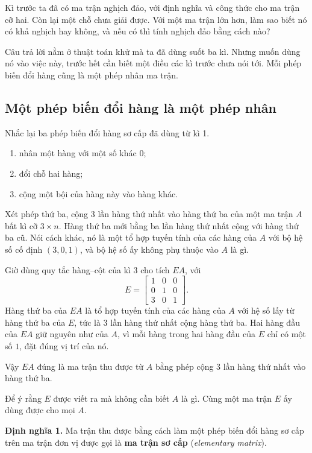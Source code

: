 \documentclass[12pt,a4paper]{article}
\begin{document}
Kì trước ta đã có ma trận nghịch đảo, với định nghĩa và công thức cho ma trận cỡ hai. Còn lại một chỗ chưa giải được. Với một ma trận lớn hơn, làm sao biết nó có khả nghịch hay không, và nếu có thì tính nghịch đảo bằng cách nào?

Câu trả lời nằm ở thuật toán khử mà ta đã dùng suốt ba kì. Nhưng muốn dùng nó vào việc này, trước hết cần biết một điều các kì trước chưa nói tới. Mỗi phép biến đổi hàng cũng là một phép nhân ma trận.

\subsection{Một phép biến đổi hàng là một phép nhân}

Nhắc lại ba phép biến đổi hàng sơ cấp đã dùng từ kì 1.

\begin{enumerate}
  \item nhân một hàng với một số khác \(0\);
  \item đổi chỗ hai hàng;
  \item cộng một bội của hàng này vào hàng khác.
\end{enumerate}

Xét phép thứ ba, cộng \(3\) lần hàng thứ nhất vào hàng thứ ba của một ma trận \(A\) bất kì cỡ \(3\times n\). Hàng thứ ba mới bằng ba lần hàng thứ nhất cộng với hàng thứ ba cũ. Nói cách khác, nó là một tổ hợp tuyến tính của các hàng của \(A\) với bộ hệ số cố định \((3,0,1)\), và bộ hệ số ấy không phụ thuộc vào \(A\) là gì.

Giờ dùng quy tắc hàng--cột của kì 3 cho tích \(EA\), với
$$
E=\left[ \begin{array}{rrr} 1 & 0 & 0\\ 0 & 1 & 0\\ 3 & 0 & 1 \end{array} \right].
$$
Hàng thứ ba của \(EA\) là tổ hợp tuyến tính của các hàng của \(A\) với hệ số lấy từ hàng thứ ba của \(E\), tức là \(3\) lần hàng thứ nhất cộng hàng thứ ba. Hai hàng đầu của \(EA\) giữ nguyên như của \(A\), vì mỗi hàng trong hai hàng đầu của \(E\) chỉ có một số \(1\), đặt đúng vị trí của nó.

Vậy \(EA\) đúng là ma trận thu được từ \(A\) bằng phép cộng \(3\) lần hàng thứ nhất vào hàng thứ ba.

Để ý rằng \(E\) được viết ra mà không cần biết \(A\) là gì. Cùng một ma trận \(E\) ấy dùng được cho mọi \(A\).

\textbf{Định nghĩa 1.} Ma trận thu được bằng cách làm một phép biến đổi hàng sơ cấp trên ma trận đơn vị được gọi là \textbf{ma trận sơ cấp} (\emph{elementary matrix}).
\end{document}
